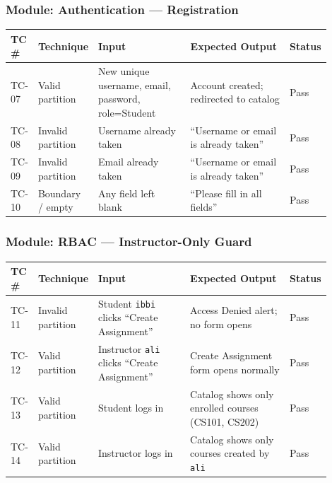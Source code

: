 \documentclass[12pt, a4paper]{article}
\begin{document}
\subsubsection*{Module: Authentication — Registration}
\begin{center}\small
\begin{tabular}{@{}p{0.06\linewidth}p{0.13\linewidth}p{0.30\linewidth}p{0.33\linewidth}p{0.08\linewidth}@{}}
  \toprule
  \textbf{TC \#} & \textbf{Technique} & \textbf{Input} & \textbf{Expected Output} & \textbf{Status} \\
  \midrule
  TC-07 & Valid partition   & New unique username, email, password, role=Student & Account created; redirected to catalog       & \textcolor{success}{Pass} \\
TC-08 & Invalid partition & Username already taken                            & ``Username or email is already taken''        & \textcolor{success}{Pass} \\
  TC-09 & Invalid partition & Email already taken                                & ``Username or email is already taken''        & \textcolor{success}{Pass} \\
TC-10 & Boundary / empty  & Any field left blank                               & ``Please fill in all fields''                 & \textcolor{success}{Pass} \\
  \bottomrule
\end{tabular}
\end{center}

\subsubsection*{Module: RBAC — Instructor-Only Guard}
\begin{center}\small
\begin{tabular}{@{}p{0.06\linewidth}p{0.13\linewidth}p{0.30\linewidth}p{0.33\linewidth}p{0.08\linewidth}@{}}
  \toprule
  \textbf{TC \#} & \textbf{Technique} & \textbf{Input} & \textbf{Expected Output} & \textbf{Status} \\
  \midrule
  TC-11 & Invalid partition & Student \texttt{ibbi} clicks ``Create Assignment'' & Access Denied alert; no form opens          & \textcolor{success}{Pass} \\
TC-12 & Valid partition   & Instructor \texttt{ali} clicks ``Create Assignment'' & Create Assignment form opens normally       & \textcolor{success}{Pass} \\
  TC-13 & Valid partition   & Student logs in                                  & Catalog shows only enrolled courses (CS101, CS202) & \textcolor{success}{Pass} \\
TC-14 & Valid partition   & Instructor logs in                               & Catalog shows only courses created by \texttt{ali}   & \textcolor{success}{Pass} \\
  \bottomrule
\end{tabular}
\end{center}
\end{document}
